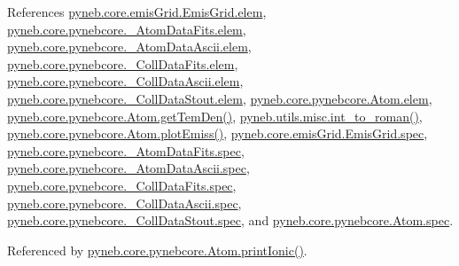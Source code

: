 References \hyperlink{emis_grid_8py_source_l00048}{pyneb.\-core.\-emis\-Grid.\-Emis\-Grid.\-elem}, \hyperlink{pynebcore_8py_source_l00090}{pyneb.\-core.\-pynebcore.\-\_\-\-Atom\-Data\-Fits.\-elem}, \hyperlink{pynebcore_8py_source_l00311}{pyneb.\-core.\-pynebcore.\-\_\-\-Atom\-Data\-Ascii.\-elem}, \hyperlink{pynebcore_8py_source_l00577}{pyneb.\-core.\-pynebcore.\-\_\-\-Coll\-Data\-Fits.\-elem}, \hyperlink{pynebcore_8py_source_l00927}{pyneb.\-core.\-pynebcore.\-\_\-\-Coll\-Data\-Ascii.\-elem}, \hyperlink{pynebcore_8py_source_l01163}{pyneb.\-core.\-pynebcore.\-\_\-\-Coll\-Data\-Stout.\-elem}, \hyperlink{pynebcore_8py_source_l01219}{pyneb.\-core.\-pynebcore.\-Atom.\-elem}, \hyperlink{pynebcore_8py_source_l02126}{pyneb.\-core.\-pynebcore.\-Atom.\-get\-Tem\-Den()}, \hyperlink{misc_8py_source_l00055}{pyneb.\-utils.\-misc.\-int\-\_\-to\-\_\-roman()}, \hyperlink{pynebcore_8py_source_l02384}{pyneb.\-core.\-pynebcore.\-Atom.\-plot\-Emiss()}, \hyperlink{emis_grid_8py_source_l00049}{pyneb.\-core.\-emis\-Grid.\-Emis\-Grid.\-spec}, \hyperlink{pynebcore_8py_source_l00091}{pyneb.\-core.\-pynebcore.\-\_\-\-Atom\-Data\-Fits.\-spec}, \hyperlink{pynebcore_8py_source_l00312}{pyneb.\-core.\-pynebcore.\-\_\-\-Atom\-Data\-Ascii.\-spec}, \hyperlink{pynebcore_8py_source_l00578}{pyneb.\-core.\-pynebcore.\-\_\-\-Coll\-Data\-Fits.\-spec}, \hyperlink{pynebcore_8py_source_l00928}{pyneb.\-core.\-pynebcore.\-\_\-\-Coll\-Data\-Ascii.\-spec}, \hyperlink{pynebcore_8py_source_l01164}{pyneb.\-core.\-pynebcore.\-\_\-\-Coll\-Data\-Stout.\-spec}, and \hyperlink{pynebcore_8py_source_l01220}{pyneb.\-core.\-pynebcore.\-Atom.\-spec}.



Referenced by \hyperlink{pynebcore_8py_source_l02233}{pyneb.\-core.\-pynebcore.\-Atom.\-print\-Ionic()}.


